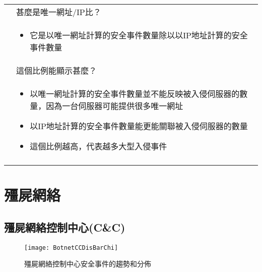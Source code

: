 \documentclass[14pt]{extarticle}
\begin{document}
\begin{table}[h!]
    \small
     \begin{center}
     \begin{tabular}{ c p{14cm} }
     \toprule
     \multirow{4}{*}{\raisebox{-\totalheight}{\texttt{[image: lightbulb]}}} & 甚麼是唯一網址/IP比？ \\\cline{2-2} 
                            & \begin{itemize}[topsep=0pt]
                                  \item 它是以唯一網址計算的安全事件數量除以以IP地址計算的安全事件數量
                              \end{itemize} \\\cline{2-2}
                            & 這個比例能顯示甚麼？ \\\cline{2-2} 
                            & \begin{itemize}[topsep=0pt]
                                  \item 以唯一網址計算的安全事件數量並不能反映被入侵伺服器的數量，因為一台伺服器可能提供很多唯一網址
                                  \item 以IP地址計算的安全事件數量能更能關聯被入侵伺服器的數量
                                  \item 這個比例越高，代表越多大型入侵事件
                             \end{itemize} \\
      \\\bottomrule
      \end{tabular}
      \end{center}    
\end{table}


\clearpage
\section{殭屍網絡}
\subsection{殭屍網絡控制中心(C\&C)}
\begin{figure}[h!]
\centerline{\texttt{[image: BotnetCCDisBarChi]}}
\caption{殭屍網絡控制中心安全事件的趨勢和分佈}
\end{figure}
\end{document}
